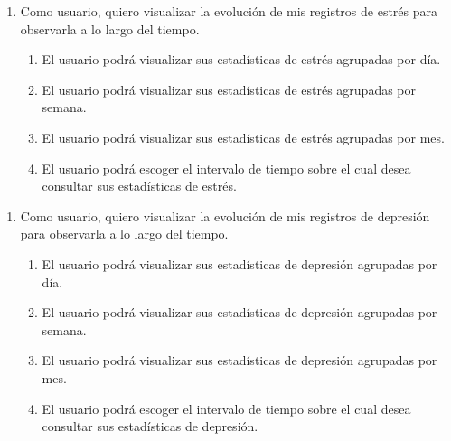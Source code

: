         \begin{enumerate}[resume=req-usuario,label=\textbf{\texttt{RU-\arabic*}}]
            \item Como usuario, quiero visualizar la evolución de mis registros de estrés para observarla a lo largo del tiempo.
            \begin{enumerate}[resume=req-funcionales,label=\textbf{\texttt{RF-\arabic*}}]
                \item El usuario podrá visualizar sus estadísticas de estrés agrupadas por día.
                \item El usuario podrá visualizar sus estadísticas de estrés agrupadas por semana.
                \item El usuario podrá visualizar sus estadísticas de estrés agrupadas por mes.
                \item El usuario podrá escoger el intervalo de tiempo sobre el cual desea consultar sus estadísticas de estrés.
            \end{enumerate}
        \end{enumerate}
        \begin{enumerate}[resume=req-usuario,label=\textbf{\texttt{RU-\arabic*}}]
            \item Como usuario, quiero visualizar la evolución de mis registros de depresión para observarla a lo largo del tiempo.
            \begin{enumerate}[resume=req-funcionales,label=\textbf{\texttt{RF-\arabic*}}]
                \item El usuario podrá visualizar sus estadísticas de depresión agrupadas por día.
                \item El usuario podrá visualizar sus estadísticas de depresión agrupadas por semana.
                \item El usuario podrá visualizar sus estadísticas de depresión agrupadas por mes.
                \item El usuario podrá escoger el intervalo de tiempo sobre el cual desea consultar sus estadísticas de depresión.
            \end{enumerate}
        \end{enumerate}
